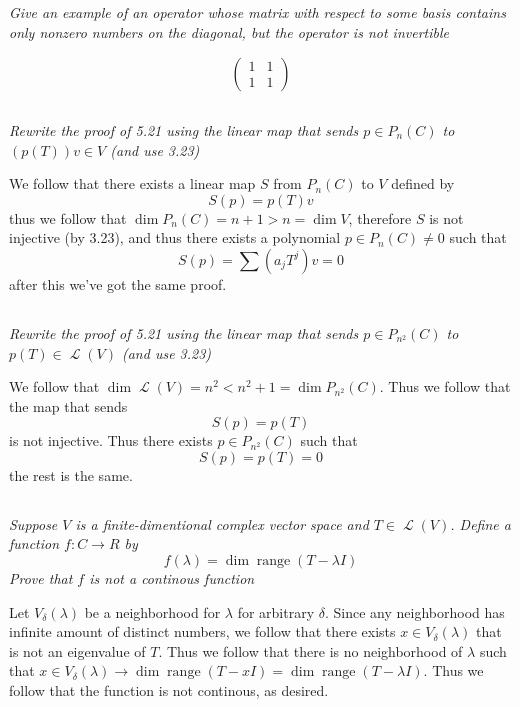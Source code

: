 \documentclass[11pt,oneside,titlepage]{book}
\DeclareMathOperator \map {\mathcal {L}}
\DeclareMathOperator \range {range}
\begin{document}
\subsection{}

\textit{Give an example of an operator whose matrix with respect to some basis contains only
  nonzero numbers on the diagonal, but the operator is not invertible}

$$
\begin{pmatrix}
  1 & 1 \\
  1 & 1
\end{pmatrix}
$$

\subsection{}

\textit{Rewrite the proof of 5.21 using the linear map that sends $p \in P_n(C)$ to $(p(T))v \in V$
  (and use 3.23)}


We follow that there exists a linear map $S$ from $P_n(C)$ to $V$ defined by
$$S(p) = p(T)v$$
thus we follow that $\dim P_n(C) = n + 1 > n = \dim V$, therefore $S$ is not injective (by 3.23),
and thus there exists a polynomial $p \in P_n(C) \neq 0$ such that
$$S(p) = \sum (a_j T^j) v = 0 $$
after this we've got the same proof.


\subsection{}

\textit{Rewrite the proof of 5.21 using the linear map that sends $p \in P_{n^2}(C)$ to
  $p(T) \in \map(V)$ (and use 3.23)}

We follow that $\dim \map(V) = n^2 < n^2 + 1 = \dim P_{n^2}(C)$. Thus we follow that
the map that sends
$$S(p) = p(T)$$
is not injective. Thus there exists $p \in P_{n^2}(C)$ such that
$$S(p) = p(T) = 0$$
the rest is the same.

\subsection{}

\textit{Suppose $V$ is a finite-dimentional complex vector space and $T \in \map(V)$.
  Define a function $f: C \to R$ by}
$$f(\lambda) = \dim \range (T - \lambda I)$$
\textit{Prove that $f$ is not a continous function}

Let $V_\delta(\lambda)$ be a neighborhood for $\lambda$ for arbitrary $\delta$. Since any
neighborhood has infinite amount of distinct numbers, we follow that there exists
$x \in V_\delta(\lambda)$ that is not an eigenvalue of $T$. Thus we follow that
there is no neighborhood of $\lambda$ such that $x \in V_\delta(\lambda) \to
\dim \range (T - x I) = \dim \range (T - \lambda I)$. Thus we follow that
the function is not continous, as desired.
\end{document}
